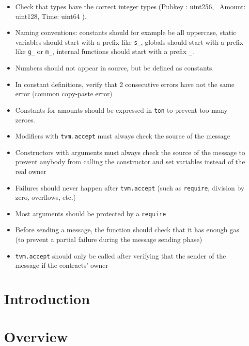 \documentclass{report}
\newif\ifsolmodules
\begin{document}
\begin{itemize}
\item Check that types have the correct integer types (Pubkey : uint256, \
   Amount: uint128, Time: uint64 ).
\item Naming conventions: constants should for example be all uppercase, static variables should start with a prefix like \verb+s_+, globals should start with a prefix like \verb+g_+ or \verb+m_+, internal functions should start with a prefix \verb+_+.
\item Numbers should not appear in source, but be defined as constants.
\item In constant definitions, verify that 2 consecutive errors have not the same error (common copy-paste error)
\item Constants for amounts should be expressed in \verb+ton+ to prevent too many zeroes.
\item Modifiers with {\tt tvm.accept} must always check the source of the message
\item Constructors with arguments must always check the source of the message to prevent anybody from calling the constructor and set variables instead of the real owner
\item Failures should never happen after {\tt tvm.accept} (such as {\tt require}, division by zero, overflows, etc.)
\item Most arguments should be protected by a {\tt require}
\item Before sending a message, the function should check that it has enough gas (to prevent a partial failure during the message sending phase)
\item {\tt tvm.accept} should only be called after verifying that the sender of the message if the contracts' owner
\end{itemize}

\chapter{Introduction}


\chapter{Overview}




\end{document}

